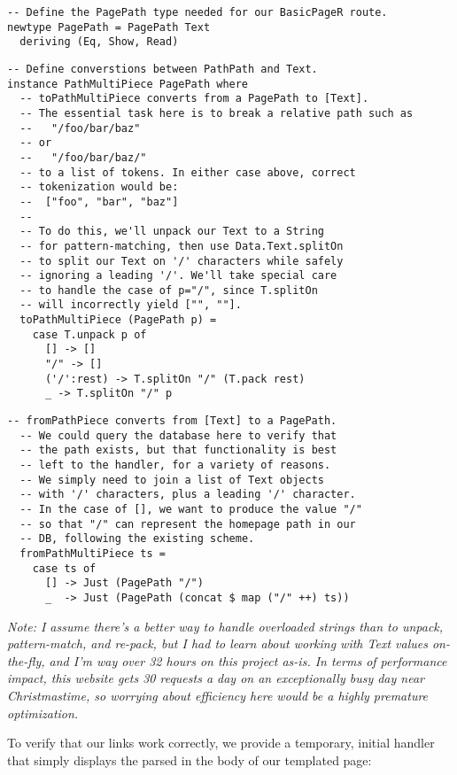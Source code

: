 \begin{Verbatim}[samepage=true]
-- Define the PagePath type needed for our BasicPageR route.
newtype PagePath = PagePath Text
  deriving (Eq, Show, Read)
\end{Verbatim}

\begin{Verbatim}[samepage=true]
-- Define converstions between PathPath and Text.
instance PathMultiPiece PagePath where
  -- toPathMultiPiece converts from a PagePath to [Text].
  -- The essential task here is to break a relative path such as
  --   "/foo/bar/baz"
  -- or
  --   "/foo/bar/baz/"
  -- to a list of tokens. In either case above, correct
  -- tokenization would be:
  --  ["foo", "bar", "baz"]
  --
  -- To do this, we'll unpack our Text to a String
  -- for pattern-matching, then use Data.Text.splitOn 
  -- to split our Text on '/' characters while safely
  -- ignoring a leading '/'. We'll take special care
  -- to handle the case of p="/", since T.splitOn
  -- will incorrectly yield ["", ""].
  toPathMultiPiece (PagePath p) = 
    case T.unpack p of
      [] -> []
      "/" -> []
      ('/':rest) -> T.splitOn "/" (T.pack rest)
      _ -> T.splitOn "/" p
\end{Verbatim}

\begin{Verbatim}[samepage=true]
  -- fromPathPiece converts from [Text] to a PagePath.
  -- We could query the database here to verify that
  -- the path exists, but that functionality is best
  -- left to the handler, for a variety of reasons.
  -- We simply need to join a list of Text objects
  -- with '/' characters, plus a leading '/' character.
  -- In the case of [], we want to produce the value "/"
  -- so that "/" can represent the homepage path in our
  -- DB, following the existing scheme.
  fromPathMultiPiece ts =
    case ts of
      [] -> Just (PagePath "/")
      _  -> Just (PagePath (concat $ map ("/" ++) ts))
\end{Verbatim}

\emph{Note: I assume there's a better way to handle overloaded strings than to unpack, pattern-match, and re-pack, but I had to learn about working with Text values on-the-fly, and I'm way over 32 hours on this project as-is. In terms of performance impact, this website gets 30 requests a day on an exceptionally busy day near Christmastime, so worrying about efficiency here would be a highly premature optimization.}

To verify that our links work correctly, we provide a temporary, initial handler that simply displays the parsed  in the body of our templated page:

